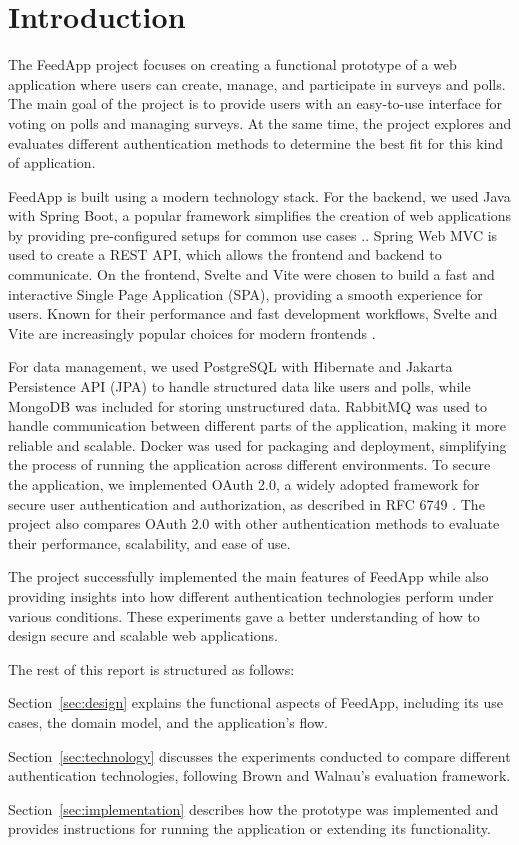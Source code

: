 \section{Introduction}
\label{sec:introduction}

The FeedApp project focuses on creating a functional prototype of a web application where users can create, manage, and participate in surveys and polls. The main goal of the project is to provide users with an easy-to-use interface for voting on polls and managing surveys. At the same time, the project explores and evaluates different authentication methods to determine the best fit for this kind of application.

FeedApp is built using a modern technology stack. For the backend, we used Java with Spring Boot, a popular framework simplifies the creation of web applications by providing pre-configured setups for common use cases \cite{springboot}.. Spring Web MVC is used to create a REST API, which allows the frontend and backend to communicate. On the frontend, Svelte and Vite were chosen to build a fast and interactive Single Page Application (SPA), providing a smooth experience for users. Known for their performance and fast development workflows, Svelte and Vite are increasingly popular choices for modern frontends \cite{svelte,vite}.

For data management, we used PostgreSQL with Hibernate and Jakarta Persistence API (JPA) to handle structured data like users and polls, while MongoDB was included for storing unstructured data. RabbitMQ was used to handle communication between different parts of the application, making it more reliable and scalable. Docker was used for packaging and deployment, simplifying the process of running the application across different environments. To secure the application, we implemented OAuth 2.0, a widely adopted framework for secure user authentication and authorization, as described in RFC 6749 \cite{oauth2spec}. The project also compares OAuth 2.0 with other authentication methods to evaluate their performance, scalability, and ease of use.

The project successfully implemented the main features of FeedApp while also providing insights into how different authentication technologies perform under various conditions. These experiments gave a better understanding of how to design secure and scalable web applications.

The rest of this report is structured as follows:

Section~\ref{sec:design} explains the functional aspects of FeedApp, including its use cases, the domain model, and the application’s flow.

Section~\ref{sec:technology} discusses the experiments conducted to compare different authentication technologies, following Brown and Walnau’s evaluation framework.

Section~\ref{sec:implementation} describes how the prototype was implemented and provides instructions for running the application or extending its functionality.